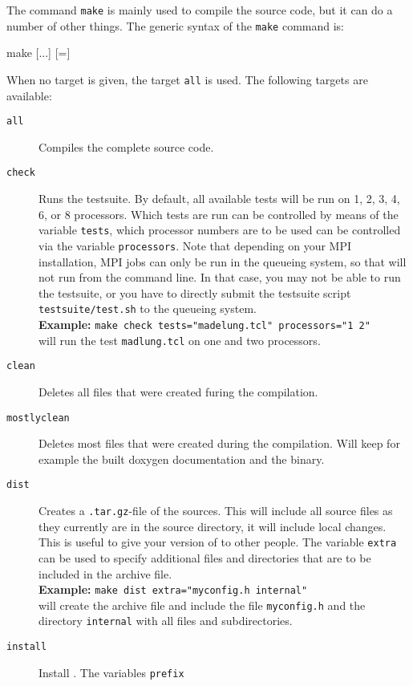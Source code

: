 The command \texttt{make} is mainly used to compile the \es{} source
code, but it can do a number of other things. The generic syntax of
the \texttt{make} command is:
\begin{code}
make [...] [=]
\end{code}
When no target is given, the target \texttt{all} is used. The
following targets are available:
\begin{description}
\item[\texttt{all}] Compiles the complete \es{} source code.
\item[\texttt{check}] Runs the testsuite. By default, all available
  tests will be run on 1, 2, 3, 4, 6, or 8 processors. Which tests are
  run can be controlled by means of the variable \texttt{tests}, which
  processor numbers are to be used can be controlled via the variable
  \texttt{processors}. Note that depending on your MPI installation,
  MPI jobs can only be run in the queueing system, so that \es{} will
  not run from the command line. In that case, you may not be able to
  run the testsuite, or you have to directly submit the testsuite script
  \verb!testsuite/test.sh! to the queueing system.\\
  \textbf{Example:} \verb!make check tests="madelung.tcl" processors="1 2"!\\
  will run the test \texttt{madlung.tcl} on one and two processors.
\item[\texttt{clean}] Deletes all files that were created furing the
  compilation.
\item[\texttt{mostlyclean}] Deletes most files that were created
  during the compilation. Will keep for example the built doxygen
  documentation and the \es{} binary.
\item[\texttt{dist}] Creates a \texttt{.tar.gz}-file of the \es{}
  sources.  This will include all source files as they currently are
  in the source directory, \ie{} it will include local changes.  This
  is useful to give your version of \es{} to other people.
  The variable \texttt{extra} can be used to specify additional
  files and directories that are to be included in the archive
  file. \\
  \textbf{Example:} \verb!make dist extra="myconfig.h internal"!\\
  will create the archive file and include the file
  \texttt{myconfig.h} and the directory \texttt{internal} with all
  files and subdirectories.
\item[\texttt{install}] Install \es{}. The variables \texttt{prefix}

\end{description}
